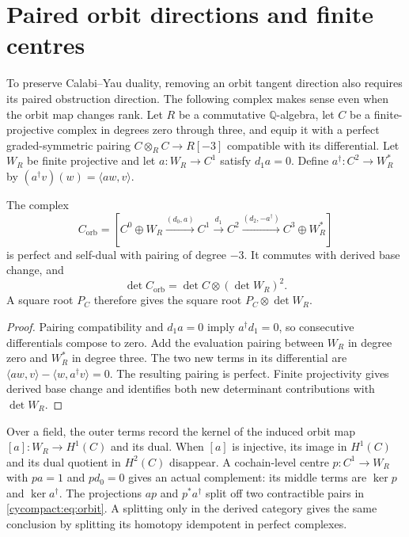 \section{Paired orbit directions and finite centres}
\label{cycompact:sec:orbit}

To preserve Calabi--Yau duality, removing an orbit tangent
direction also requires its paired obstruction direction.
The following complex
makes sense even when the orbit map changes rank. Let $R$ be
a commutative $\mathbb Q$-algebra, let $C$ be a finite-projective
complex in degrees zero through three, and equip it with a
perfect graded-symmetric pairing
$C\otimes_RC\to R[-3]$ compatible with its differential.
Let $W_R$ be finite projective and let $a:W_R\to C^1$ satisfy
$d_1a=0$. Define $a^\dagger:C^2\to W_R^*$ by
$(a^\dagger v)(w)=\langle aw,v\rangle$.

\begin{proposition}\label{cycompact:prop:orbit}
The complex
\begin{equation}\label{cycompact:eq:orbit}
 C_{\mathrm{orb}}=
 [C^0\oplus W_R\xrightarrow{(d_0,a)}C^1
 \xrightarrow{d_1}C^2
 \xrightarrow{(d_2,-a^\dagger)}C^3\oplus W_R^*]
\end{equation}
is perfect and self-dual with pairing of degree $-3$.
It commutes with derived base change, and
\[
 \det C_{\mathrm{orb}}=\det C\otimes(\det W_R)^2.
\]
A square root $P_C$ therefore gives the square root
$P_C\otimes\det W_R$.
\end{proposition}

\begin{proof}
Pairing compatibility and $d_1a=0$ imply $a^\dagger d_1=0$,
so consecutive differentials compose to zero. Add the evaluation
pairing between $W_R$ in degree zero and $W_R^*$ in degree
three. The two new terms in its differential are
$\langle aw,v\rangle-\langle w,a^\dagger v\rangle=0$.
The resulting pairing is perfect. Finite projectivity gives
derived base change and identifies both new determinant
contributions with $\det W_R$.
\end{proof}

Over a field, the outer terms record the kernel of the induced
orbit map $[a]:W_R\to H^1(C)$ and its dual. When $[a]$ is
injective, its image in $H^1(C)$ and its dual quotient in
$H^2(C)$ disappear. A cochain-level centre
$p:C^1\to W_R$ with $pa=1$ and $pd_0=0$ gives an actual
complement: its middle terms are $\ker p$ and $\ker a^\dagger$.
The projections $ap$ and $p^*a^\dagger$ split off two
contractible pairs in \eqref{cycompact:eq:orbit}. A splitting
only in the derived category gives the same conclusion by
splitting its homotopy idempotent in perfect complexes.

